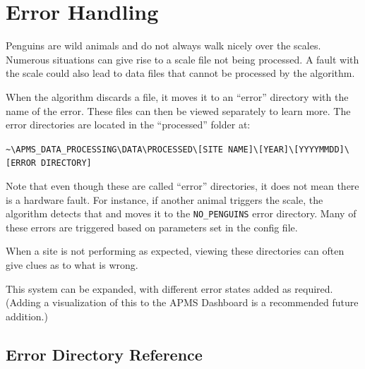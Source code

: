 \documentclass[
  letterpaper,
]{scrbook}
\begin{document}
\section{Error Handling}\label{error-handling}

Penguins are wild animals and do not always walk nicely over the scales.
Numerous situations can give rise to a scale file not being processed. A
fault with the scale could also lead to data files that cannot be
processed by the algorithm.

When the algorithm discards a file, it moves it to an ``error''
directory with the name of the error. These files can then be viewed
separately to learn more. The error directories are located in the
``processed'' folder at:

\texttt{\textasciitilde{}\textbackslash{}APMS\_DATA\_PROCESSING\textbackslash{}DATA\textbackslash{}PROCESSED\textbackslash{}{[}SITE\ NAME{]}\textbackslash{}{[}YEAR{]}\textbackslash{}{[}YYYYMMDD{]}\textbackslash{}{[}ERROR\ DIRECTORY{]}}

Note that even though these are called ``error'' directories, it does
not mean there is a hardware fault. For instance, if another animal
triggers the scale, the algorithm detects that and moves it to the
\texttt{NO\_PENGUINS} error directory. Many of these errors are
triggered based on parameters set in the config file.

When a site is not performing as expected, viewing these directories can
often give clues as to what is wrong.

This system can be expanded, with different error states added as
required. (Adding a visualization of this to the APMS Dashboard is a
recommended future addition.)

\subsection{Error Directory Reference}\label{error-directory-reference}
\end{document}
